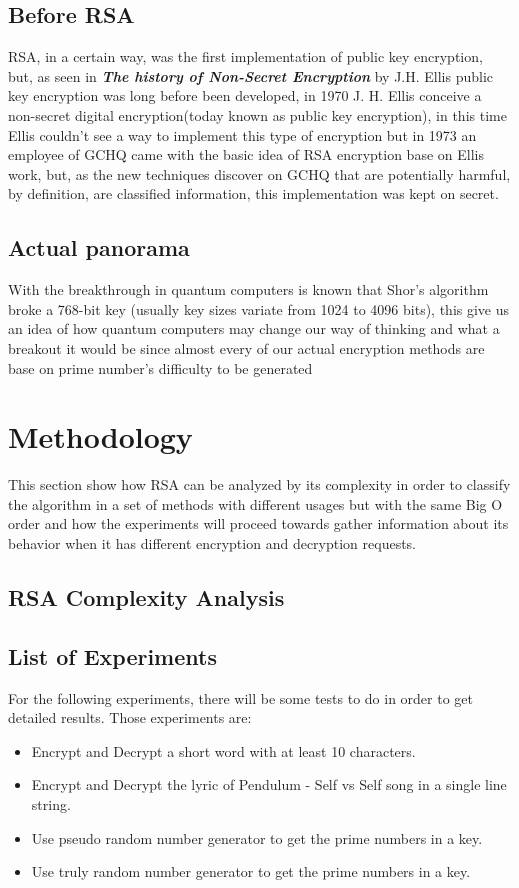 \documentclass[conference,compsoc, 10pt]{IEEEtran}
\begin{document}
\subsection{Before RSA}
RSA, in a certain way, was the first implementation of public key encryption, but, as seen in \textbf{\textit{The history of Non-Secret Encryption}} by J.H. Ellis public key encryption was long before been developed, in 1970 J. H. Ellis conceive a non-secret digital encryption(today known as public key encryption), in this time Ellis couldn't see a way to implement this type of encryption but in 1973 an employee of GCHQ came with the basic idea of RSA encryption base on Ellis work, but, as the new techniques discover on GCHQ that are potentially harmful, by definition, are classified information, this implementation was kept on secret.

\subsection{Actual panorama}
With the breakthrough in quantum computers is known that Shor's algorithm broke a 768-bit key (usually key sizes variate from 1024 to 4096 bits), this give us an idea of how quantum computers may change our way of thinking and what a breakout it would be since almost every of our actual encryption methods are base on prime number's difficulty to be generated

\section{Methodology}
This section show how RSA can be analyzed by its complexity in order to classify the algorithm in a set of methods with different usages but with the same Big O order and how the experiments will proceed towards gather information about its behavior when it has different encryption and decryption requests.

\subsection{RSA Complexity Analysis}


\subsection{List of Experiments}
For the following experiments, there will be some tests to do in order to get detailed results. Those experiments are:

\begin{itemize}
	\item Encrypt and Decrypt a short word with at least 10 characters.
	\item Encrypt and Decrypt the lyric of Pendulum - Self vs Self song in a single line string.
	\item Use pseudo random number generator to get the prime numbers in a key.
	\item Use truly random number generator to get the prime numbers in a key.
\end{itemize}
\end{document}
